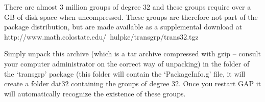 
There are almost 3 million groups of degree 32 and these groups require over
a GB of disk space when uncompressed.
These groups are therefore not part of the package
distribution, but are made available as a supplemental download at 
\begintt
http://www.math.colostate.edu/~hulpke/transgrp/trans32.tgz
\endtt

Simply unpack this archive (which is a tar archive compressed with gzip --
consult your computer administrator on the correct way of unpacking)
in the folder of the `transgrp' package (this
folder will contain the `PackageInfo.g' file, it will create a folder dat32
containing the groups of degree 32. Once you restart GAP it will
automatically recognize the existence of these groups.
